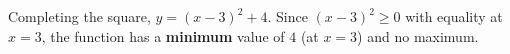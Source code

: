 Completing the square, $y=(x-3)^2+4$. Since $(x-3)^2\ge0$ with equality at $x=3$, the function has a \textbf{minimum} value of $\boxed{4}$ (at $x=3$) and no maximum.
